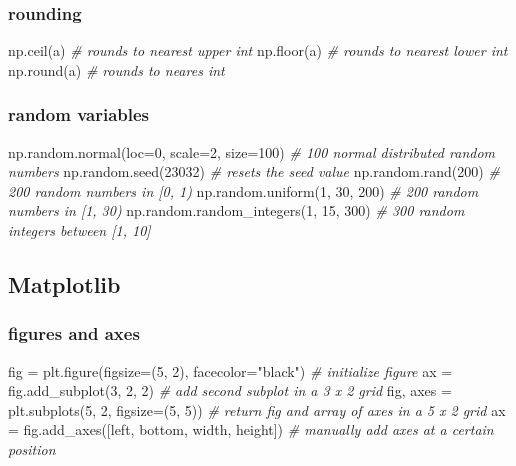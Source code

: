 \documentclass[]{article}
\newenvironment{Shaded}{}{}
\newcommand{\DataTypeTok}[1]{\textcolor[rgb]{0.56,0.13,0.00}{{#1}}}
\newcommand{\DecValTok}[1]{\textcolor[rgb]{0.25,0.63,0.44}{{#1}}}
\newcommand{\StringTok}[1]{\textcolor[rgb]{0.25,0.44,0.63}{{#1}}}
\newcommand{\CommentTok}[1]{\textcolor[rgb]{0.38,0.63,0.69}{\textit{{#1}}}}
\newcommand{\NormalTok}[1]{{#1}}
\begin{document}
\subsubsection{rounding}

\begin{Shaded}
\begin{Highlighting}[]
\NormalTok{np.ceil(a) }\CommentTok{# rounds to nearest upper int}
\NormalTok{np.floor(a) }\CommentTok{# rounds to nearest lower int}
\NormalTok{np.}\DataTypeTok{round}\NormalTok{(a) }\CommentTok{# rounds to neares int}
\end{Highlighting}
\end{Shaded}

\subsubsection{random variables}

\begin{Shaded}
\begin{Highlighting}[]
\NormalTok{np.random.normal(loc=}\DecValTok{0}\NormalTok{, scale=}\DecValTok{2}\NormalTok{, size=}\DecValTok{100}\NormalTok{) }\CommentTok{# 100 normal distributed random numbers}
\NormalTok{np.random.seed(}\DecValTok{23032}\NormalTok{) }\CommentTok{# resets the seed value}
\NormalTok{np.random.rand(}\DecValTok{200}\NormalTok{) }\CommentTok{# 200 random numbers in [0, 1)}
\NormalTok{np.random.uniform(}\DecValTok{1}\NormalTok{, }\DecValTok{30}\NormalTok{, }\DecValTok{200}\NormalTok{) }\CommentTok{# 200 random numbers in [1, 30)}
\NormalTok{np.random.random_integers(}\DecValTok{1}\NormalTok{, }\DecValTok{15}\NormalTok{, }\DecValTok{300}\NormalTok{) }\CommentTok{# 300 random integers between [1, 10]}
\end{Highlighting}
\end{Shaded}

\subsection{Matplotlib}

\subsubsection{figures and axes}

\begin{Shaded}
\begin{Highlighting}[]
\NormalTok{fig = plt.figure(figsize=(}\DecValTok{5}\NormalTok{, }\DecValTok{2}\NormalTok{), facecolor=}\StringTok{"black"}\NormalTok{) }\CommentTok{# initialize figure}
\NormalTok{ax = fig.add_subplot(}\DecValTok{3}\NormalTok{, }\DecValTok{2}\NormalTok{, }\DecValTok{2}\NormalTok{) }\CommentTok{# add second subplot in a 3 x 2 grid}
\NormalTok{fig, axes = plt.subplots(}\DecValTok{5}\NormalTok{, }\DecValTok{2}\NormalTok{, figsize=(}\DecValTok{5}\NormalTok{, }\DecValTok{5}\NormalTok{)) }\CommentTok{# return fig and array of axes in a 5 x 2 grid}
\NormalTok{ax = fig.add_axes([left, bottom, width, height]) }\CommentTok{# manually add axes at a certain position}
\end{Highlighting}
\end{Shaded}
\end{document}
